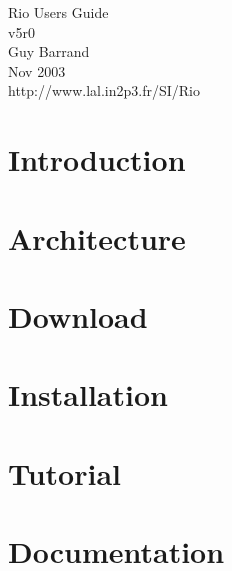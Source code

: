 \documentclass[a4paper]{book}
\begin{document}
\begin{titlepage}
\vspace*{7cm}
\begin{center}
{\Large Rio Users Guide\\[1ex]\large v5r0}\\
\vspace*{1cm}
{\large Guy Barrand}\\
\vspace*{0.5cm}
{\small Nov 2003}\\
\vspace*{0.5cm}
{\small http://www.lal.in2p3.fr/SI/Rio}\\
\end{center}
\end{titlepage}
\clearemptydoublepage
{}
\tableofcontents
\clearemptydoublepage
{}
\chapter{Introduction}

\chapter{Architecture}

\chapter{Download}

\chapter{Installation}

\chapter{Tutorial}

\chapter{Documentation}

\printindex
\end{document}
